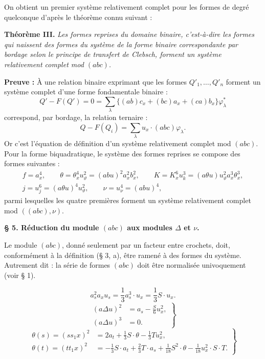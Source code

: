 \documentclass[11pt]{article}
\newcommand{\A}{\Delta}
\begin{document}
On obtient un premier système relativement complet pour les formes de degré quelconque d'après le théorème connu suivant :


\clearpage
\noindent\textbf{Théorème III.}
\emph{Les formes reprises du domaine binaire, c'est-à-dire les formes qui naissent des formes du système de la forme binaire correspondante par bordage selon le principe de transfert de Clebsch, forment un système relativement complet mod $(abc)$.}

\noindent\textbf{Preuve :}
À une relation binaire exprimant que les formes $Q'_1,\ldots,Q'_n$ forment un système complet d'une forme fondamentale binaire :
\[
Q'-F(Q')=0=\sum_\lambda\bigl\{(ab)c_x+(bc)a_x+(ca)b_x\bigr\}\varphi_\lambda^{*}
\]
correspond, par bordage, la relation ternaire :
\[
Q-F(Q_i)=\sum_\lambda u_x\cdot(abc)\varphi_\lambda .
\]
Or c'est l'équation de définition d'un système relativement complet mod $(abc)$. Pour la forme biquadratique, le système des formes reprises se compose des formes suivantes :
\[
\begin{gathered}
f=a_x^4,\qquad
\theta=\theta_x^4u_\vartheta^2=(abu)^2a_x^2b_x^2,\qquad
K=K_x^6u_k^3=(a\theta u)u_\vartheta^2a_x^3\theta_x^3,\\
j=u_j^6=(a\theta u)^4u_\vartheta^2,\qquad
\nu=u_\nu^4=(abu)^4,
\end{gathered}
\]
parmi lesquelles les quatre premières forment un système relativement complet mod $((abc),\nu)$.

\begin{center}
\textbf{\S{} 5. \quad Réduction du module $(abc)$ aux modules $\A$ et $\nu$.}
\end{center}

Le module $(abc)$, donné seulement par un facteur entre crochets, doit, conformément à la définition (\S{} 3, a), être ramené à des formes du système. Autrement dit : la série de formes $(abc)$ doit être normalisée univoquement (voir \S{} 1).

\[
a_s^2a_xu_s=\frac13a_s^3\cdot u_x=\frac13S\cdot u_x. \tag{2}
\]
\[
\left.
\begin{aligned}
(a\A u)^2&=a_s-\frac{S}{6}u_x^2,\\
(a\A u)^3&=0.
\end{aligned}
\right\} \tag{3}
\]
\[
\left.
\begin{aligned}
\theta(s)=(ss_1x)^2&=2a_t+\frac13S\cdot\theta-\frac13Tu_x^2,\\
\theta(t)=(tt_1x)^2&=-\frac13S\cdot a_t+\frac23T\cdot a_s+\frac1{18}S^2\cdot\theta-\frac1{18}u_x^2\cdot S\cdot T.
\end{aligned}
\right\} \tag{4}
\]
\end{document}

